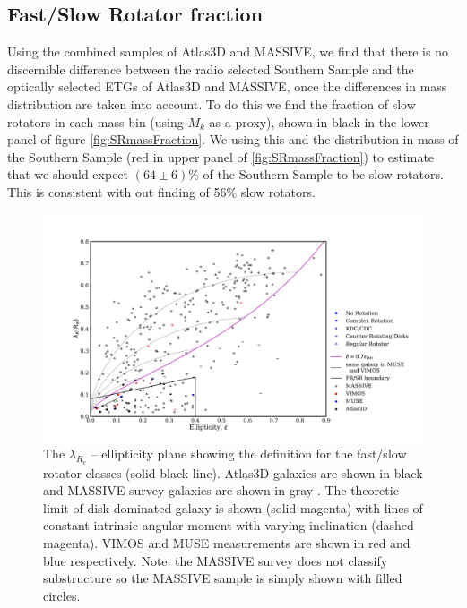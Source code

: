 

	\subsection{Fast/Slow Rotator fraction}
		\label{subsec:FSfrac}
		Using the combined samples of Atlas3D and MASSIVE, we find that there is no discernible difference between the radio selected Southern Sample and the optically selected ETGs of Atlas3D and MASSIVE, once the differences in mass distribution are taken into account. To do this we find the fraction of slow rotators in each mass bin (using $M_k$ as a proxy), shown in black in the lower panel of figure \ref{fig:SRmassFraction}. We using this and the distribution in mass of the Southern Sample (red in upper panel of \ref{fig:SRmassFraction}) to estimate that we should expect $(64 \pm 6)\%$ of the Southern Sample to be slow rotators. This is consistent with out finding of 56\% slow rotators.

		\begin{figure}
			\centering
			\includegraphics[width=\textwidth]{chapter4/lambda_R_ellipticity.png}
			\caption[$\lambda_{R_e}$ -- ellipticity plane]{The $\lambda_{R_e}$ -- ellipticity plane showing the definition for the fast/slow rotator classes (solid black line). Atlas3D galaxies are shown in black \citep{Emsellem2011} and MASSIVE survey galaxies are shown in gray \citep{Veale2017}. The theoretic limit of disk dominated galaxy is shown (solid magenta) with lines of constant intrinsic angular moment with varying inclination (dashed magenta). VIMOS and MUSE measurements are shown in red and blue respectively. Note: the MASSIVE survey does not classify substructure so the MASSIVE sample is simply shown with filled circles.}
			\label{fig:lambdaR_ellip}
		\end{figure}


